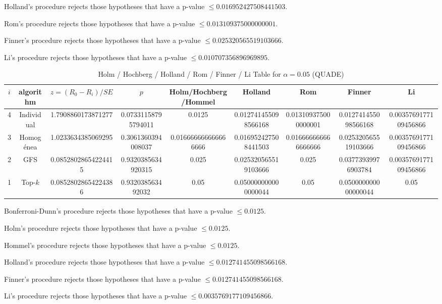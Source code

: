 \documentclass[a4paper,10pt]{article}
\begin{document}
\begin{landscape}
Holland's procedure rejects those hypotheses that have a p-value $\le0.016952427508441503$.


Rom's procedure rejects those hypotheses that have a p-value $\le0.013109375000000001$.


Finner's procedure rejects those hypotheses that have a p-value $\le0.025320565519103666$.


Li's procedure rejects those hypotheses that have a p-value $\le0.010707356896969895$.



\newpage

\begin{table}[!htp]
\centering\scriptsize
\caption{Holm / Hochberg / Holland / Rom / Finner / Li Table for $\alpha=0.05$ (QUADE)}
\begin{tabular}{ccccccccc}
$i$&algorithm&$z=(R_0 - R_i)/SE$&$p$&Holm/Hochberg/Hommel&Holland&Rom&Finner&Li\\
\hline
4&Individual&1.7908860173871277&0.07331158795794011&0.0125&0.012741455098566168&0.013109375000000001&0.012741455098566168&0.0035769177109456866\\
3&Homogénea&1.0233634385069295&0.3061360394008037&0.016666666666666666&0.016952427508441503&0.016666666666666666&0.025320565519103666&0.0035769177109456866\\
2&GFS&0.08528028654224415&0.9320385634920315&0.025&0.025320565519103666&0.025&0.03773939976903784&0.0035769177109456866\\
1&Top-$k$&0.08528028654224386&0.932038563492032&0.05&0.050000000000000044&0.05&0.050000000000000044&0.05\\
\hline
\end{tabular}
\end{table}
Bonferroni-Dunn's procedure rejects those hypotheses that have a p-value $\le0.0125$.


Holm's procedure rejects those hypotheses that have a p-value $\le0.0125$.


Hommel's procedure rejects those hypotheses that have a p-value $\le0.0125$.


Holland's procedure rejects those hypotheses that have a p-value $\le0.012741455098566168$.


Finner's procedure rejects those hypotheses that have a p-value $\le0.012741455098566168$.


Li's procedure rejects those hypotheses that have a p-value $\le0.0035769177109456866$.



\newpage


\end{landscape}
\end{document}
